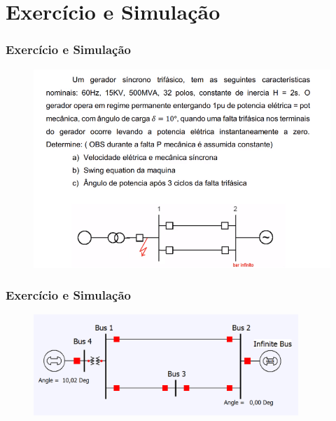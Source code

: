 \section{Exercício e Simulação}
\begin{frame}
\frametitle{Exercício e Simulação}
\begin{figure}[h!]
\begin{center}
    \includegraphics[width=15.3cm]{imagens/exm.png}  
\end{center}
\label{maq10} 
\end{figure}
\end{frame}

\begin{frame}
\frametitle{Exercício e Simulação}
\begin{figure}[h!]
\begin{center}
    \includegraphics[width=10cm]{imagens/exm2.png}  
\end{center}
\label{maq10} 
\end{figure}
\end{frame}


